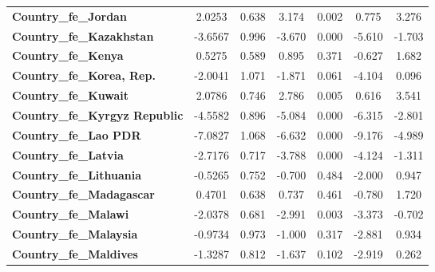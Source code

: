 \begin{center}
\begin{tabular}{lcccccc}
\textbf{Country\_fe\_Jordan}                         &       2.0253  &        0.638     &     3.174  &         0.002        &        0.775    &        3.276     \\
\textbf{Country\_fe\_Kazakhstan}                     &      -3.6567  &        0.996     &    -3.670  &         0.000        &       -5.610    &       -1.703     \\
\textbf{Country\_fe\_Kenya}                          &       0.5275  &        0.589     &     0.895  &         0.371        &       -0.627    &        1.682     \\
\textbf{Country\_fe\_Korea, Rep.}                    &      -2.0041  &        1.071     &    -1.871  &         0.061        &       -4.104    &        0.096     \\
\textbf{Country\_fe\_Kuwait}                         &       2.0786  &        0.746     &     2.786  &         0.005        &        0.616    &        3.541     \\
\textbf{Country\_fe\_Kyrgyz Republic}                &      -4.5582  &        0.896     &    -5.084  &         0.000        &       -6.315    &       -2.801     \\
\textbf{Country\_fe\_Lao PDR}                        &      -7.0827  &        1.068     &    -6.632  &         0.000        &       -9.176    &       -4.989     \\
\textbf{Country\_fe\_Latvia}                         &      -2.7176  &        0.717     &    -3.788  &         0.000        &       -4.124    &       -1.311     \\
\textbf{Country\_fe\_Lithuania}                      &      -0.5265  &        0.752     &    -0.700  &         0.484        &       -2.000    &        0.947     \\
\textbf{Country\_fe\_Madagascar}                     &       0.4701  &        0.638     &     0.737  &         0.461        &       -0.780    &        1.720     \\
\textbf{Country\_fe\_Malawi}                         &      -2.0378  &        0.681     &    -2.991  &         0.003        &       -3.373    &       -0.702     \\
\textbf{Country\_fe\_Malaysia}                       &      -0.9734  &        0.973     &    -1.000  &         0.317        &       -2.881    &        0.934     \\
\textbf{Country\_fe\_Maldives}                       &      -1.3287  &        0.812     &    -1.637  &         0.102        &       -2.919    &        0.262     \\

\end{tabular}
\end{center}
